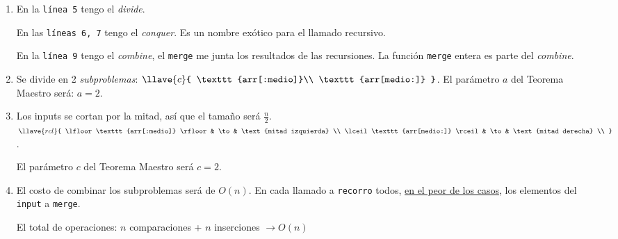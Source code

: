\begin{enumerate}[label=\arabic*)]
  \item
        En la \texttt{línea 5} tengo el \textit{divide}.

        En las \texttt{líneas 6, 7} tengo el \textit{conquer}. Es un nombre exótico para el llamado recursivo.

        En la \texttt{línea 9} tengo el \textit{combine}, el \texttt{merge} me junta los resultados de las recursiones.
        La función \texttt{merge} entera es parte del \textit{combine}.

  \item Se divide en 2 \textit{subproblemas}:
        $
          \llave{c}{
            \texttt{arr[:medio]}\\
            \texttt{arr[medio:]}
          }
        $.
        El parámetro $a$ del Teorema Maestro será: $a = 2$.

  \item Los inputs se cortan por la mitad, así que el tamaño será $\frac{n}{2}$.
        $
          \llave{rcl}{
            \lfloor \texttt{arr[:medio]} \rfloor & \to & \text{mitad izquierda} \\
            \lceil \texttt{arr[medio:]} \rceil & \to & \text{mitad derecha} \\
          }
        $.

        El parámetro $c$
        del Teorema Maestro será $c = 2$.

  \item El costo de combinar los subproblemas será de $O(n)$. En cada llamado a \texttt{recorro} todos,
        \ul{en el peor de los casos}, los elementos del \texttt{input} a \texttt{merge}.

        El total de operaciones: $n$ comparaciones + $n$ inserciones $\to O(n)$


\end{enumerate}
